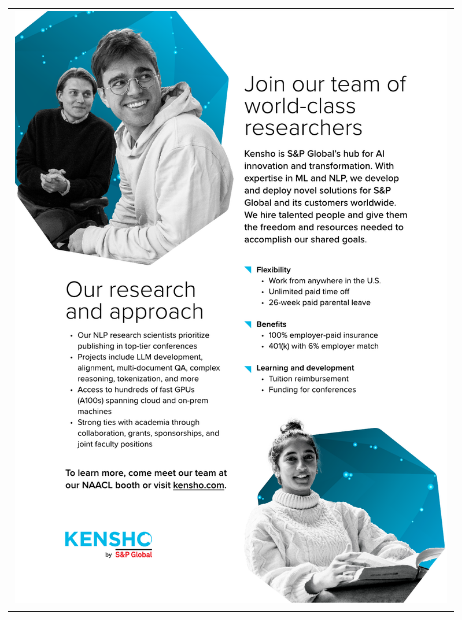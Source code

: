 \begin{center}\begin{tabular}{c}
  \includegraphics[width=4.5in]{content/ads/kensho} \\
\end{tabular}\end{center}

